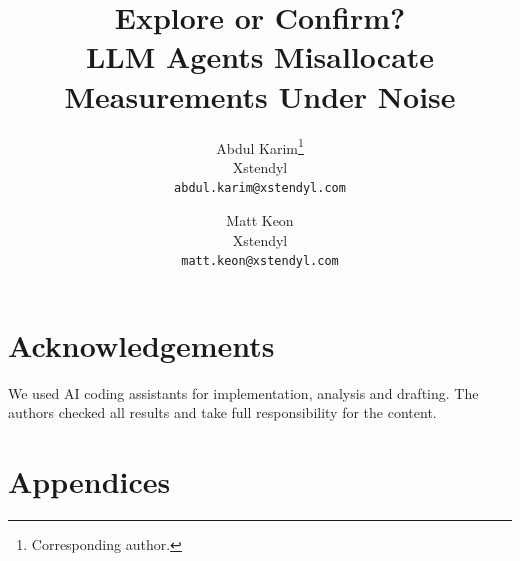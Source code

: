 \documentclass[11pt]{article}
\title{Explore or Confirm?\\
LLM Agents Misallocate Measurements Under Noise}
\author{
  Abdul Karim\thanks{Corresponding author.} \\ Xstendyl \\ \texttt{abdul.karim@xstendyl.com}
  \and
  Matt Keon \\ Xstendyl \\ \texttt{matt.keon@xstendyl.com}
}
\date{}
\begin{document}
\maketitle










\section*{Acknowledgements}

We used AI coding assistants for implementation, analysis and drafting. The authors checked all results and take full responsibility for the content.



\clearpage
\appendix
\section*{Appendices}





\end{document}
